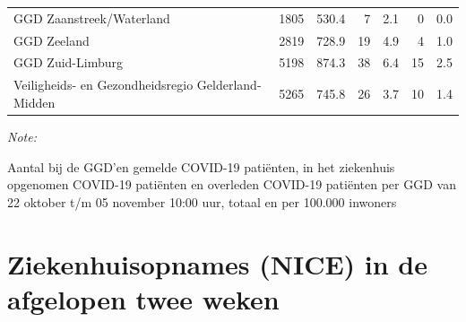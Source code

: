 \documentclass[
  english,
  man,floatsintext]{apa6}
\begin{document}
\begin{table}
\begin{threeparttable}
\begin{tabular}{lrrrrrr}
GGD Zaanstreek/Waterland & 1805 & 530.4 & 7 & 2.1 & 0 & 0.0\\
GGD Zeeland & 2819 & 728.9 & 19 & 4.9 & 4 & 1.0\\
GGD Zuid-Limburg & 5198 & 874.3 & 38 & 6.4 & 15 & 2.5\\
Veiligheids- en Gezondheidsregio Gelderland-Midden & 5265 & 745.8 & 26 & 3.7 & 10 & 1.4\\
\bottomrule
\end{tabular}
\begin{tablenotes}
\item \textit{Note: } 
\item Aantal bij de GGD’en gemelde COVID-19 patiënten, in het ziekenhuis opgenomen COVID-19 patiënten en overleden COVID-19 patiënten per GGD van 22 oktober t/m 05 november 10:00 uur, totaal en per 100.000 inwoners
\end{tablenotes}
\end{threeparttable}
\endgroup{}
\end{table}

\newpage

\hypertarget{ziekenhuisopnames-nice-in-de-afgelopen-twee-weken}{%
\section{Ziekenhuisopnames (NICE) in de afgelopen twee weken}\label{ziekenhuisopnames-nice-in-de-afgelopen-twee-weken}}
\end{document}
